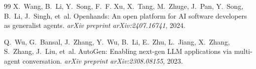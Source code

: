 \begin{thebibliography}{99}
X.~Wang, B.~Li, Y.~Song, F.~F. Xu, X.~Tang, M.~Zhuge, J.~Pan, Y.~Song,
  B.~Li, J.~Singh, et~al.
\newblock Openhands: An open platform for AI software developers as generalist
  agents.
\newblock \emph{arXiv preprint arXiv:2407.16741}, 2024.

Q.~Wu, G.~Bansal, J.~Zhang, Y.~Wu, B.~Li, E.~Zhu, L.~Jiang, X.~Zhang,
  S.~Zhang, J.~Liu, et~al.
\newblock AutoGen: Enabling next-gen LLM applications via multi-agent
  conversation.
\newblock \emph{arXiv preprint arXiv:2308.08155}, 2023.

\end{thebibliography}

